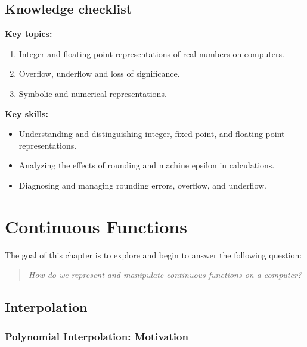 \documentclass[
  letterpaper,
  DIV=11,
  numbers=noendperiod]{scrreprt}
\begin{document}
\section*{Knowledge checklist}\label{knowledge-checklist}


\textbf{Key topics:}

\begin{enumerate}
\def\labelenumi{\arabic{enumi}.}
\item
  Integer and floating point representations of real numbers on
  computers.
\item
  Overflow, underflow and loss of significance.
\item
  Symbolic and numerical representations.
\end{enumerate}

\textbf{Key skills:}

\begin{itemize}
\item
  Understanding and distinguishing integer, fixed-point, and
  floating-point representations.
\item
  Analyzing the effects of rounding and machine epsilon in calculations.
\item
  Diagnosing and managing rounding errors, overflow, and underflow.
\end{itemize}


\chapter{Continuous Functions}\label{continuous-functions}

The goal of this chapter is to explore and begin to answer the following
question:

\begin{quote}
\emph{How do we represent and manipulate continuous functions on a
computer?}
\end{quote}

\section{Interpolation}\label{interpolation}

\subsection{Polynomial Interpolation:
Motivation}\label{polynomial-interpolation-motivation}
\end{document}
